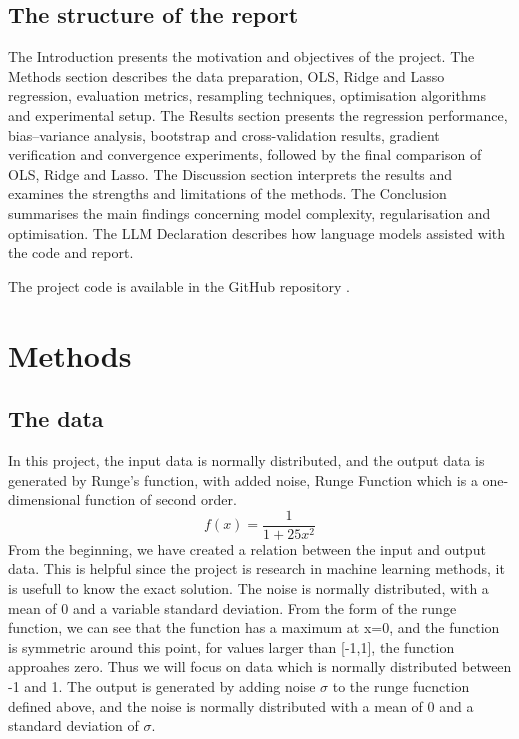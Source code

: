 \documentclass[aps,rmp,reprint,raggedbottom,amsmath,amssymb,longbibliography]{revtex4-1}
\let\label\ReportKernelLabel
\begin{document}
\subsection{The structure of the report}
\label{subsec:Structure}
The Introduction presents the motivation and objectives
of the project.
The Methods section describes the data preparation, OLS,
Ridge and Lasso regression, evaluation metrics, resampling
techniques, optimisation algorithms and experimental setup.
The Results section presents the regression performance,
bias--variance analysis, bootstrap and cross-validation
results, gradient verification and convergence experiments,
followed by the final comparison of OLS, Ridge and Lasso.
The Discussion section interprets the results and examines
the strengths and limitations of the methods.
The Conclusion summarises the main findings concerning
model complexity, regularisation and optimisation.
The LLM Declaration describes how language models assisted
with the code and report.

The project code is available in the GitHub repository
\cite{Timholmen96FYSSTK4155Prosjektarbeid}.

\section{Methods}
\subsection{The data}
In this project, the input data is normally distributed, and the output data is generated by Runge's function, with added noise,
Runge Function which is a one-dimensional function of second order.
\[
  f(x) = \frac{1}{1 + 25x^2}
\]
From the beginning, we have created a relation between the input and output data. This is helpful since the project is research in machine learning methods, it is usefull to know the exact solution.
The noise is normally distributed, with a mean of 0 and a variable standard deviation.
From the form of the runge function, we can see that the function has a maximum at x=0, and the function is symmetric around this point,
for values larger than [-1,1], the function approahes zero.
Thus we will focus on data which is normally distributed between -1 and 1.
The output is generated by adding noise $\sigma$ to the runge fucnction defined above, and the noise is normally distributed with a mean of 0 and a standard deviation of $\sigma$.
\end{document}
